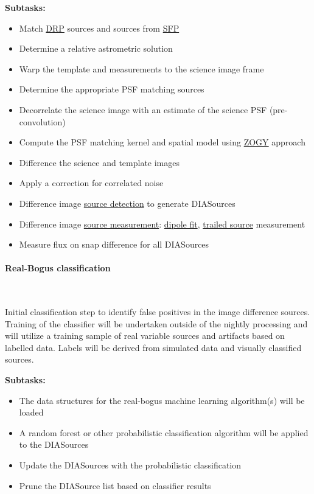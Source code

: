 \noindent
{\bf Subtasks:}
\begin{itemize}
\item Match \hyperref[sec:apSourcemeasurement]{DRP} sources and
  sources from \hyperref[sec:apSingleFrameProcessing]{SFP}
\item Determine a relative astrometric solution
\item Warp the template and measurements to the science image frame
\item Determine the appropriate PSF matching sources
\item Decorrelate the science image with an estimate of the science PSF (pre-convolution) 
\item Compute the PSF matching kernel and spatial model using
  \hyperref[sec:acDiffImDecorrelation]{ZOGY} approach
\item Difference the science and template images
\item Apply a correction for correlated noise
\item Difference image \hyperref[sec:acSourceDetection]{source
    detection} to generate DIASources
\item Difference image  \hyperref[sec:acMeasurement]{source
    measurement}: \hyperref[sec:acDipoleModels]{dipole fit}, \hyperref[sec:acTrailedPointSourceModels]{trailed source} measurement
\item Measure flux on snap difference for all DIASources
\end{itemize}

\paragraph{Real-Bogus classification}~

Initial classification step to identify false positives in the image
difference sources. Training of the classifier will be undertaken
outside of the nightly processing and will utilize a training sample
of real variable sources and artifacts based on labelled data. Labels
will be derived from simulated data and visually classified sources.

\noindent
{\bf Subtasks:}
\begin{itemize}
\item The data structures for the real-bogus machine learning
  algorithm(s) will be loaded
\item A random forest or other probabilistic classification algorithm will be
  applied to the DIASources
\item Update the DIASources with the probabilistic classification 
\item Prune the DIASource list based on classifier results
\end{itemize}

